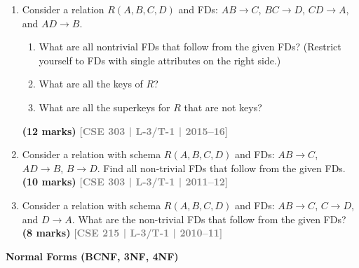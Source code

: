 \documentclass[12pt,a3paper]{article}
\newcommand{\yr}[1]{\hfill\textcolor{gray}{\small\textbf{[#1]}}}
\newcommand{\mk}[1]{\textcolor{orange!70!black}{\small\textbf{(#1 marks)}}}
\newcommand{\subtopic}[2]{%
  \vspace{10pt}
  \noindent\begin{tcolorbox}[colback=#1!8,colframe=#1,boxrule=0.6pt,arc=4pt,
    left=6pt,right=6pt,top=4pt,bottom=4pt]
    \small\bfseries\textcolor{#1}{#2}
  \end{tcolorbox}
  \vspace{2pt}
}
\begin{document}
\begin{enumerate}
\item Consider a relation $R(A, B, C, D)$ and FDs: $AB \to C$, $BC \to D$, $CD \to A$, and $AD \to B$.
\begin{enumerate}
  \item What are all nontrivial FDs that follow from the given FDs? (Restrict yourself to FDs with single attributes on the right side.)
  \item What are all the keys of $R$?
  \item What are all the superkeys for $R$ that are not keys?
\end{enumerate}
\mk{12} \yr{CSE 303 | L-3/T-1 | 2015--16}

\item Consider a relation with schema $R(A, B, C, D)$ and FDs: $AB \to C$, $AD \to B$, $B \to D$. Find all non-trivial FDs that follow from the given FDs.
\mk{10} \yr{CSE 303 | L-3/T-1 | 2011--12}

\item Consider a relation with schema $R(A, B, C, D)$ and FDs: $AB \to C$, $C \to D$, and $D \to A$. What are the non-trivial FDs that follow from the given FDs?
\mk{8} \yr{CSE 215 | L-3/T-1 | 2010--11}

\end{enumerate}

\subtopic{cC}{Normal Forms (BCNF, 3NF, 4NF)}
\label{sub:s4-nf}
\end{document}
